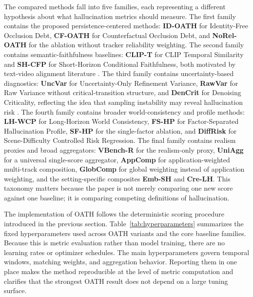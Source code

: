 \documentclass{article}
\begin{document}
The compared methods fall into five families, each representing a different hypothesis about what hallucination metrics should measure. The first family contains the proposed persistence-centered methods: \textbf{ID-OATH} for Identity-Free Occlusion Debt, \textbf{CF-OATH} for Counterfactual Occlusion Debt, and \textbf{NoRel-OATH} for the ablation without tracker reliability weighting. The second family contains semantic-faithfulness baselines: \textbf{CLIP-T} for CLIP Temporal Similarity and \textbf{SH-CFP} for Short-Horizon Conditional Faithfulness, both motivated by text-video alignment literature \cite{clip2021,clipscore2021,tifa2023}. The third family contains uncertainty-based diagnostics: \textbf{UncVar} for Uncertainty-Only Refinement Variance, \textbf{RawVar} for Raw Variance without critical-transition structure, and \textbf{DenCrit} for Denoising Criticality, reflecting the idea that sampling instability may reveal hallucination risk \cite{diffusion_uncertainty2024,consistency_models2023}. The fourth family contains broader world-consistency and profile methods: \textbf{LH-WCP} for Long-Horizon World Consistency, \textbf{FS-HP} for Factor-Separated Hallucination Profile, \textbf{SF-HP} for the single-factor ablation, and \textbf{DiffRisk} for Scene-Difficulty Controlled Risk Regression. The final family contains realism proxies and broad aggregators: \textbf{VBench-R} for the realism-only proxy, \textbf{UniAgg} for a universal single-score aggregator, \textbf{AppComp} for application-weighted multi-track composition, \textbf{GlobComp} for global weighting instead of application weighting, and the setting-specific composites \textbf{Emb-SH} and \textbf{Cre-LH}. This taxonomy matters because the paper is not merely comparing one new score against one baseline; it is comparing competing definitions of hallucination.

The implementation of OATH follows the deterministic scoring procedure introduced in the previous section. Table~\ref{tab:hyperparameters} summarizes the fixed hyperparameters used across OATH variants and the core baseline families. Because this is metric evaluation rather than model training, there are no learning rates or optimizer schedules. The main hyperparameters govern temporal windows, matching weights, and aggregation behavior. Reporting them in one place makes the method reproducible at the level of metric computation and clarifies that the strongest OATH result does not depend on a large tuning surface.
\end{document}
